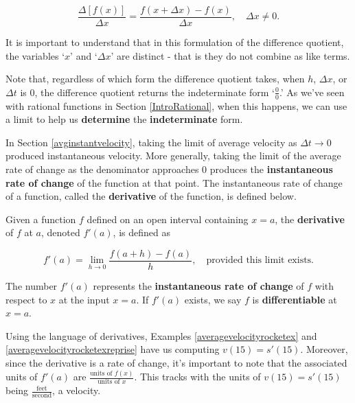 \documentclass{ximera}
\begin{document}
\[  \frac{\Delta[f(x)]}{\Delta x} =  \frac{f(x+\Delta x)-f(x)}{\Delta x}, \quad \Delta x \neq 0.\]


It is important to understand that in this formulation of the difference quotient, the variables `$x$' and `$\Delta x$' are distinct - that is they do not combine as like terms. 




Note that, regardless of which form the difference quotient takes, when $h$,  $\Delta x$, or  $\Delta t$ is $0$, the difference quotient returns the indeterminate form `$\frac{0}{0}$.' As we've seen with rational functions in Section \ref{IntroRational}, when this happens, we can use a limit to help us \textbf{determine} the \textbf{indeterminate} form.  



In Section \ref{avginstantvelocity}, taking the limit of average velocity as $\Delta t \rightarrow 0$  produced instantaneous velocity.  More generally, taking the limit of the average rate of change  as the denominator approaches $0$ produces the \textbf{instantaneous rate of change} of the function at that point.   The instantaneous rate of change of a function, called the \textbf{derivative} of the function, is defined below.





\begin{definition} \label{derivativedefn} Given a function $f$ defined on an open interval containing $x=a$, the \textbf{derivative} of $f$ at $a$, denoted $f'(a)$, is defined as

\[ f'(a) = \lim_{h \rightarrow 0}  \frac{f(a+h) - f(a)}{h}, \quad \text{provided this limit exists.} \]

 The number $f'(a)$ represents the \textbf{instantaneous rate of change} of $f$ with respect to $x$ at the input $x = a$.  If $f'(a)$ exists, we say $f$ is \textbf{differentiable} at $x = a$.

\end{definition}




Using the language of derivatives, Examples \ref{averagevelocityrocketex}  and \ref{averagevelocityrocketexreprise} have us computing $v(15) = s'(15)$.   Moreover, since the derivative is a rate of change, it's important to note that the associated units of $f'(a)$ are $\frac{ \text{units of $f(x)$}}{\text{units of $x$}}$.  This tracks with the units of  $v(15) = s'(15)$ being $\frac{ \text{feet}}{\text{second}}$, a velocity.
\end{document}

